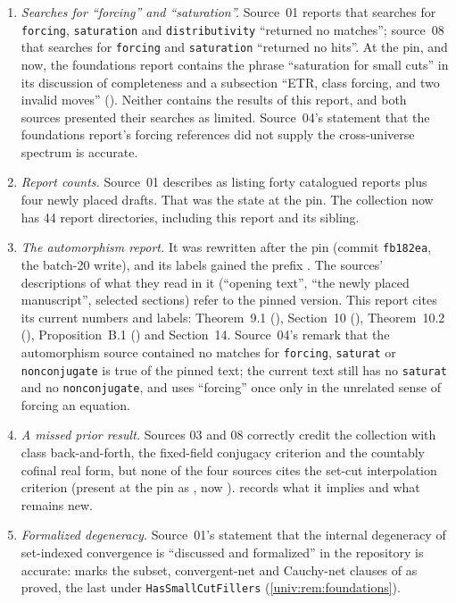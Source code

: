 \documentclass[11pt,letterpaper]{article}
\numberwithin{equation}{section}
\theoremstyle{definition}
\theoremstyle{remark}
\begin{document}
\begin{enumerate}
\item \emph{Searches for ``forcing'' and ``saturation''.} Source~01 reports that
searches for \texttt{forcing}, \texttt{saturation} and \texttt{distributivity}
``returned no matches''; source~08 that searches for \texttt{forcing} and
\texttt{saturation} ``returned no hits''. At the pin, and now, the foundations
report contains the phrase ``saturation for small cuts'' in its discussion of
completeness and a subsection ``ETR, class forcing, and two invalid moves''
(). Neither contains the results of this report, and both
sources presented their searches as limited. Source~04's statement that the
foundations report's forcing references did not supply the cross-universe
spectrum is accurate.
\item \emph{Report counts.} Source~01 describes  as listing
forty catalogued reports plus four newly placed drafts. That was the state at the
pin. The collection now has 44 report directories, including this report and
its sibling.
\item \emph{The automorphism report.} It was rewritten after the pin (commit
\texttt{fb182ea}, the batch-20 write), and its labels gained the prefix
. The sources' descriptions of what they read in it (``opening
text'', ``the newly placed manuscript'', selected sections) refer to the pinned
version. This report cites its current numbers and labels: Theorem~9.1
(), Section~10 (),
Theorem~10.2 (), Proposition~B.1
() and Section~14. Source~04's remark
that the automorphism source contained no matches for \texttt{forcing},
\texttt{saturat} or \texttt{nonconjugate} is true of the pinned text; the
current text still has no \texttt{saturat} and no \texttt{nonconjugate}, and
uses ``forcing'' once only in the unrelated sense of forcing an equation.
\item \emph{A missed prior result.} Sources 03 and 08 correctly credit the
collection with class back-and-forth, the fixed-field conjugacy criterion and
the countably cofinal real form, but none of the four sources cites the
set-cut interpolation criterion (present at the pin as
, now ).
 records what it implies and what remains new.
\item \emph{Formalized degeneracy.} Source~01's statement that the internal
degeneracy of set-indexed convergence is ``discussed and formalized'' in the
repository is accurate:  marks the
subset, convergent-net and Cauchy-net clauses of 
as proved, the last under \texttt{HasSmallCutFillers}
(\cref{univ:rem:foundations}).
\end{enumerate}
\end{document}
